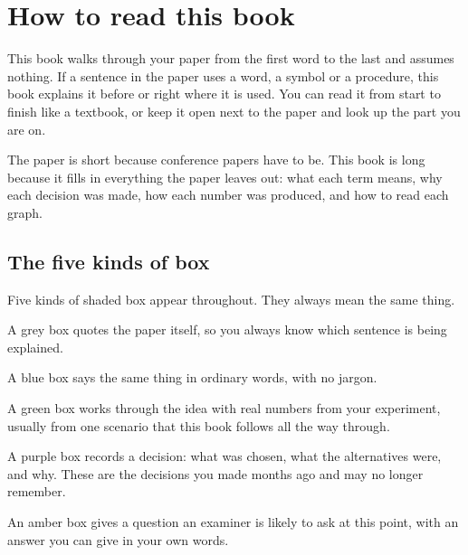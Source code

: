 \chapter*{How to read this book}

This book walks through your paper from the first word to the last and assumes nothing. If a sentence in the paper uses a word, a symbol or a procedure, this book explains it before or right where it is used. You can read it from start to finish like a textbook, or keep it open next to the paper and look up the part you are on.

The paper is short because conference papers have to be. This book is long because it fills in everything the paper leaves out: what each term means, why each decision was made, how each number was produced, and how to read each graph.

\section*{The five kinds of box}

Five kinds of shaded box appear throughout. They always mean the same thing.

\begin{paper}
A grey box quotes the paper itself, so you always know which sentence is being explained.
\end{paper}

\begin{plain}
A blue box says the same thing in ordinary words, with no jargon.
\end{plain}

\begin{example}
A green box works through the idea with real numbers from your experiment, usually from one scenario that this book follows all the way through.
\end{example}

\begin{why}
A purple box records a decision: what was chosen, what the alternatives were, and why. These are the decisions you made months ago and may no longer remember.
\end{why}

\begin{ask}
An amber box gives a question an examiner is likely to ask at this point, with an answer you can give in your own words.
\end{ask}

